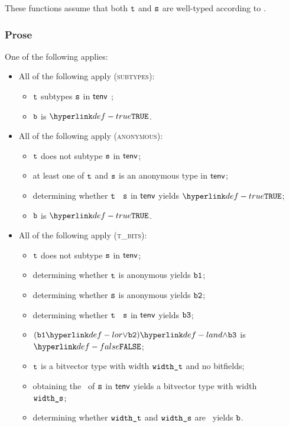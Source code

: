 These functions assume that both $\texttt{t}$ and $\texttt{s}$ are well-typed according to .

\subsubsection{Prose}
One of the following applies:
 \begin{itemize}
  \item All of the following apply (\textsc{subtypes}):
    \begin{itemize}
    \item $\texttt{t}$ subtypes $\texttt{s}$ in $\textsf{tenv}$ ;
    \item $\texttt{b}$ is $\True$.
  \end{itemize}

  \item All of the following apply (\textsc{anonymous}):
  \begin{itemize}
    \item $\texttt{t}$ does not subtype $\texttt{s}$ in $\textsf{tenv}$;
    \item at least one of $\texttt{t}$ and $\texttt{s}$ is an anonymous type in $\textsf{tenv}$;
    \item determining whether $\texttt{t}$ \subtypesatisfies\ $\texttt{s}$ in $\textsf{tenv}$ yields $\True$\ProseOrTypeError;
    \item $\texttt{b}$ is $\True$.
  \end{itemize}

  \item All of the following apply (\textsc{t\_bits}):
  \begin{itemize}
    \item $\texttt{t}$ does not subtype $\texttt{s}$ in $\textsf{tenv}$;
    \item determining whether $\texttt{t}$ is anonymous yields $\texttt{b1}$;
    \item determining whether $\texttt{s}$ is anonymous yields $\texttt{b2}$;
    \item determining whether $\texttt{t}$ \subtypesatisfies\ $\texttt{s}$ in $\textsf{tenv}$ yields $\texttt{b3}$;
    \item $(\vbone \lor \vbtwo) \land \vbthree$ is $\False$;
    \item $\texttt{t}$ is a bitvector type with width $\texttt{width\_t}$ and no bitfields;
    \item obtaining the \structure\ of $\texttt{s}$ in $\textsf{tenv}$ yields a bitvector type with width \\
          $\texttt{width\_s}$\ProseOrTypeError;
    \item determining whether $\texttt{width\_t}$ and $\texttt{width\_s}$ are \bitwidthequivalent\ yields $\texttt{b}$.
  \end{itemize}


\end{itemize}
